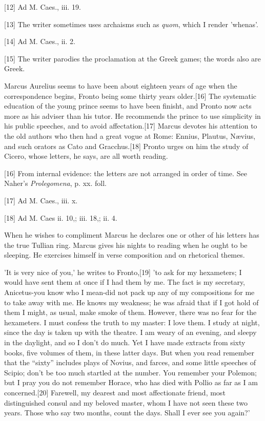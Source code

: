 [12]
Ad M. Caes., iii. 19.

[13]
The writer sometimes uses archaisms such as \emph{quom}, which I render
'whenas'.

[14]
Ad M. Caes., ii. 2.

[15]
The writer parodies the proclamation at the Greek games; the words also are
Greek.

Marcus Aurelius seems to have been about eighteen years of age when the
correspondence begins, Fronto being some thirty years
older.[16]
The systematic education of the young prince seems to have been finisht,
and Pronto now acts more as his adviser than his tutor. He recommends the
prince to use simplicity in his public speeches, and to avoid
affectation.[17]
Marcus devotes his attention to the old authors who then had a great
vogue at Rome: Ennius, Plautus, Nævius, and such orators as Cato and
Gracchus.[18]
Pronto urges on him the study of Cicero, whose letters, he says, are all
worth reading.

[16]
From internal evidence: the letters are not arranged in order of time. See
Naher's \emph{Prolegomena}, p. xx. foll.

[17]
Ad M. Caes., iii. x.

[18]
Ad M. Caes ii. 10,; iii. 18,; ii. 4.

When he wishes to compliment Marcus he declares one or other of his
letters has the true Tullian ring. Marcus gives his nights to reading when
he ought to be sleeping. He exercises himself in verse composition and on
rhetorical themes.

'It is very nice of you,' he writes to Fronto,[19]
'to ask for my hexameters; I would have sent them at once if I had them
by me. The fact is my secretary, Anicetus-you know who I mean-did not
pack up any of my compositions for me to take away with me. He knows my
weakness; he was afraid that if I got hold of them I might, as usual,
make smoke of them. However, there was no fear for the hexameters. I must
confess the truth to my master: I love them. I study at night, since the
day is taken up with the theatre. I am weary of an evening, and sleepy in
the daylight, and so I don't do much. Yet I have made extracts from sixty
books, five volumes of them, in these latter days. But when you read
remember that the ``sixty'' includes plays of Novius, and farces, and some
little speeches of Scipio; don't be too much startled at the number. You
remember your Polemon; but I pray you do not remember Horace, who has
died with Pollio as far as I am concerned.[20]
Farewell, my dearest and most affectionate friend, most distinguished
consul and my beloved master, whom I have not seen these two years. Those
who say two months, count the days. Shall I ever see you again?'

